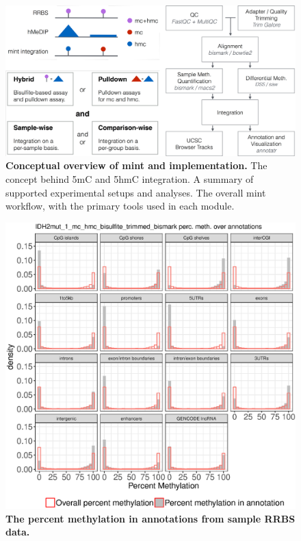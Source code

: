 \begin{figure}[ht!]
\centering
\includegraphics[width=1\textwidth]{chap5figs/figure5_1.pdf}
\caption[Conceptual overview of mint and implementation.]
{
\textbf{Conceptual overview of mint and implementation.} The concept behind 5mC and 5hmC integration. A summary of supported experimental setups and analyses. The overall mint workflow, with the primary tools used in each module.
}
\label{chap5:fig:1}
\end{figure}

\newpage

\begin{figure}[ht!]
\centering
\includegraphics[width=1\textwidth]{chap5figs/figure5_2.eps}
\caption[The percent methylation in annotations from sample RRBS data.]
{
\textbf{The percent methylation in annotations from sample RRBS data.}
}
\label{chap5:fig:2}
\end{figure}

